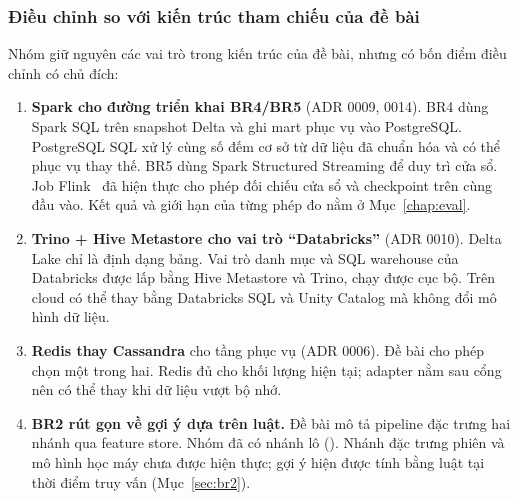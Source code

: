 \subsubsection{Điều chỉnh so với kiến trúc tham chiếu của đề bài}
\label{sec:deviations}

Nhóm giữ nguyên các vai trò trong kiến trúc của đề bài, nhưng có bốn điểm điều chỉnh có chủ đích:

\begin{enumerate}
  \item \textbf{Spark cho đường triển khai BR4/BR5} (ADR 0009, 0014). BR4 dùng Spark SQL trên snapshot Delta và ghi mart phục vụ vào PostgreSQL. PostgreSQL SQL xử lý cùng số đếm cơ sở từ dữ liệu đã chuẩn hóa và có thể phục vụ thay thế. BR5 dùng Spark Structured Streaming để duy trì cửa sổ. Job Flink~\cite{carbone2015flink} đã hiện thực cho phép đối chiếu cửa sổ và checkpoint trên cùng đầu vào. Kết quả và giới hạn của từng phép đo nằm ở Mục~\ref{chap:eval}.
  \item \textbf{Trino + Hive Metastore cho vai trò ``Databricks''} (ADR 0010). Delta Lake chỉ là định dạng bảng. Vai trò danh mục và SQL warehouse của Databricks được lấp bằng Hive Metastore và Trino, chạy được cục bộ. Trên cloud có thể thay bằng Databricks SQL và Unity Catalog mà không đổi mô hình dữ liệu.
  \item \textbf{Redis thay Cassandra} cho tầng phục vụ (ADR 0006). Đề bài cho phép chọn một trong hai. Redis đủ cho khối lượng hiện tại; adapter nằm sau cổng nên có thể thay khi dữ liệu vượt bộ nhớ.
  \item \textbf{BR2 rút gọn về gợi ý dựa trên luật.} Đề bài mô tả pipeline đặc trưng hai nhánh qua feature store. Nhóm đã có nhánh lô (). Nhánh đặc trưng phiên và mô hình học máy chưa được hiện thực; gợi ý hiện được tính bằng luật tại thời điểm truy vấn (Mục~\ref{sec:br2}).
\end{enumerate}
